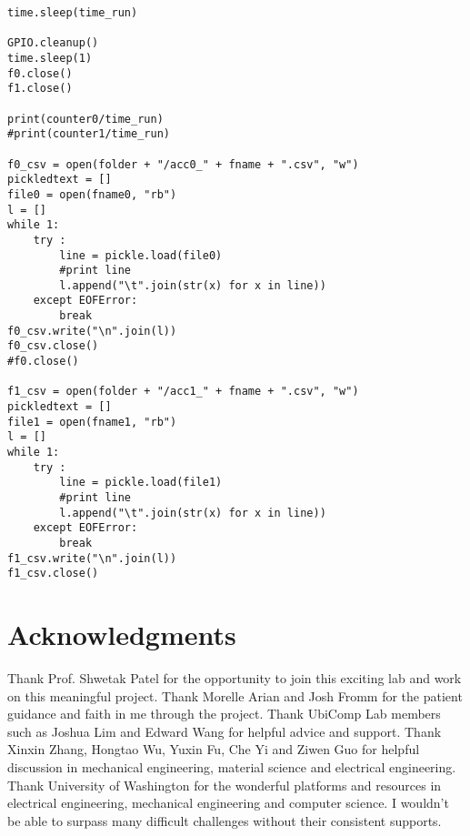 \documentclass{sigchi}
\begin{document}
\begin{lstlisting}
time.sleep(time_run)

GPIO.cleanup()
time.sleep(1)
f0.close()
f1.close()

print(counter0/time_run)
#print(counter1/time_run)

f0_csv = open(folder + "/acc0_" + fname + ".csv", "w")
pickledtext = []
file0 = open(fname0, "rb")
l = []
while 1:
    try :
        line = pickle.load(file0)
        #print line
        l.append("\t".join(str(x) for x in line))
    except EOFError:
        break
f0_csv.write("\n".join(l))
f0_csv.close()
#f0.close()

f1_csv = open(folder + "/acc1_" + fname + ".csv", "w")
pickledtext = []
file1 = open(fname1, "rb")
l = []
while 1:
    try :
        line = pickle.load(file1)
        #print line
        l.append("\t".join(str(x) for x in line))
    except EOFError:
        break
f1_csv.write("\n".join(l))
f1_csv.close()
\end{lstlisting}


\section{Acknowledgments}

Thank Prof. Shwetak Patel for the opportunity to join this exciting lab and work on this meaningful project. Thank Morelle Arian and Josh Fromm for the patient guidance and faith in me through the project. Thank UbiComp Lab members such as Joshua Lim and Edward Wang for helpful advice and support. Thank Xinxin Zhang, Hongtao Wu, Yuxin Fu, Che Yi and Ziwen Guo for helpful discussion in mechanical engineering, material science and electrical engineering. Thank University of Washington for the wonderful platforms and resources in electrical engineering, mechanical engineering and computer science. I wouldn't be able to surpass many difficult challenges without their consistent supports.

\balance{}




\end{document}
